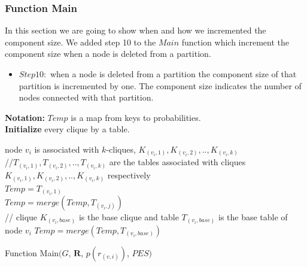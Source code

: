 \documentclass[12pt]{article}
\begin{document}
\subsubsection{Function Main}
In this section we are going to show when and how we incremented the component size. We added step 10 to the $Main$ function which increment the component size when a node is deleted from a partition.

\begin{itemize}[noitemsep]
\item $Step 10:$ when a node is deleted from a partition the component size of that partition is incremented by one. The component size indicates the number of nodes connected with that partition.
\end{itemize}
\begin{algorithm} [h]
\Indm
{}
\textbf {Notation:} $Temp$ is a map from keys to probabilities.\\
\Indp
\nl \textbf{Initialize } every clique by  a table.\\
\nl{}
{
 \nl node $v_i$ is associated with $k$-cliques, $K_{(v_i,1)},K_{(v_i,2)},..,K_{(v_i,k)}$ \\
 //$T_{(v_i,1)},T_{(v_i,2)},..,T_{(v_i,k)}$ are the tables associated with cliques $K_{(v_i,1)},K_{(v_i,2)},..,K_{(v_i,k)}$ respectively \\
\nl $ Temp=T_{(v_i,1)}$  \\
 \nl {}
 {
  \nl $Temp=merge(Temp,T_{(v_i,j)})$\\
 }
 // clique $K_{(v_i,base)}$ is the base clique and table $T_{(v_i,base)}$ is the base table of node $v_i$
  \nl $Temp=merge(Temp,T_{(v_i,base)})$\\
\nl  {}

}

\nl {}
\caption{Function Main$(G$, $\textbf{R}$, $p(r_{(v,i)})$, $PES )$}
\end{algorithm}
\end{document}
